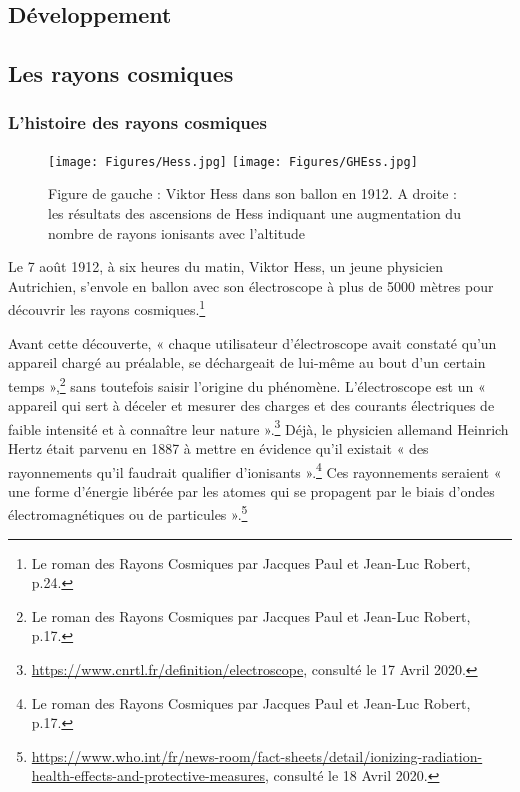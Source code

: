 \documentclass[a4paper, 12pt]{article}
\begin{document}
\begin{spacing}{1.5}
\pagebreak

\section{Développement}

\subsection{Les rayons cosmiques}

\subsubsection{L'histoire des rayons cosmiques}

\begin{figure}[t]
\begin{center}
  \texttt{[image: Figures/Hess.jpg]}
  \texttt{[image: Figures/GHEss.jpg]}
\vspace{-0.3cm}
\caption{\label{fig:Hess}Figure de gauche : Viktor Hess dans son ballon en 1912. A droite : les résultats des ascensions de Hess indiquant une augmentation du nombre de rayons ionisants avec l'altitude}
\end{center}
\end{figure}

Le 7 août 1912, à six heures du matin, Viktor Hess, un jeune physicien Autrichien, s'envole en ballon avec son électroscope à plus de 5000 mètres pour découvrir les rayons cosmiques.\footnote{Le roman des Rayons Cosmiques par Jacques Paul et Jean-Luc Robert, p.24.}

Avant cette découverte, « chaque utilisateur d’électroscope avait constaté qu’un appareil chargé au préalable, se déchargeait de lui-même au bout d’un certain temps »,\footnote{Le roman des Rayons Cosmiques par Jacques Paul et Jean-Luc Robert, p.17.} sans toutefois saisir l'origine du phénomène. L’électroscope est un « appareil qui sert à déceler et mesurer des charges et des courants électriques de faible intensité et à connaître leur nature ».\footnote{\url{https://www.cnrtl.fr/definition/electroscope}, consulté le 17 Avril 2020.} Déjà, le physicien allemand Heinrich Hertz était parvenu en 1887 à mettre en évidence qu’il existait « des rayonnements qu’il faudrait qualifier d’ionisants ».\footnote{Le roman des Rayons Cosmiques par Jacques Paul et Jean-Luc Robert, p.17.} Ces rayonnements seraient « une forme d’énergie libérée par les atomes qui se propagent par le biais d’ondes électromagnétiques ou de particules ».\footnote{\url{https://www.who.int/fr/news-room/fact-sheets/detail/ionizing-radiation-health-effects-and-protective-measures}, consulté le 18 Avril 2020.} 



\end{spacing}
\end{document}

